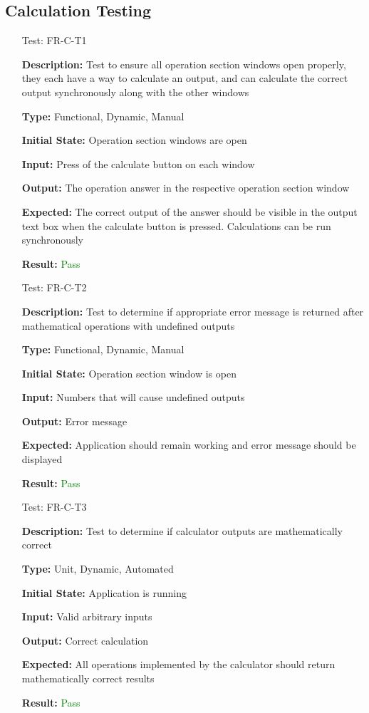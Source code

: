 \documentclass[12pt, titlepage]{article}
\begin{document}
\subsection{Calculation Testing}
\begin{enumerate}

\item[Test:]{FR-C-T1\\}

\textbf{Description:} Test to ensure all operation section windows open properly, they each have a way to calculate an output, and can calculate the correct output synchronously along with the other windows

\textbf{Type:} Functional, Dynamic, Manual
					
\textbf{Initial State:} Operation section windows are open
					
\textbf{Input:} Press of the calculate button on each window
					
\textbf{Output:} The operation answer in the respective operation section window

\textbf{Expected:} The correct output of the answer should be visible in the output text box when the calculate button is pressed. Calculations can be run synchronously

\textbf{Result:} \textcolor{Green}{Pass}


\item[Test:]{FR-C-T2\\}

\textbf{Description:} Test to determine if appropriate error message is returned after mathematical operations with undefined outputs

\textbf{Type:} Functional, Dynamic, Manual
					
\textbf{Initial State:} Operation section window is open 
					
\textbf{Input:} Numbers that will cause undefined outputs
					
\textbf{Output:} Error message

\textbf{Expected:} Application should remain working and error message should be displayed

\textbf{Result:} \textcolor{Green}{Pass}

\item[Test:]{FR-C-T3\\}

\textbf{Description:} Test to determine if calculator outputs are mathematically correct

\textbf{Type:} Unit, Dynamic, Automated
					
\textbf{Initial State:} Application is running
					
\textbf{Input:} Valid arbitrary inputs
					
\textbf{Output:} Correct calculation

\textbf{Expected:} All operations implemented by the calculator should return mathematically correct results

\textbf{Result:} \textcolor{Green}{Pass}


\end{enumerate}
\end{document}
